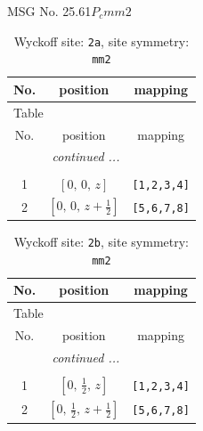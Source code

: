 \documentclass[fleqn,8pt]{jsarticle}
\begin{document}
\setcounter{MaxMatrixCols}{32}

\renewcommand{\tablename}{Table~}
\renewcommand{\figurename}{Figure~}
\begin{center}
\LARGE
MSG No. 25.61\quad$P_{c}mm2$
\end{center}
\renewcommand{\arraystretch}{1.2}
\begin{longtable}{ccc}
\caption{Wyckoff site: {\tt 2a}, site symmetry: {\tt mm2}}
 \\
 \hline \hline
No. & position & mapping \\ \hline \endfirsthead

\multicolumn{2}{l}{\tablename\ \thetable{}} \\
 \hline \hline
No. & position & mapping \\ \hline \endhead

 \hline \hline
\multicolumn{2}{r}{\footnotesize\it continued ...} \\ \endfoot

 \hline \hline
\multicolumn{2}{r}{} \\ \endlastfoot

1 & $\left[ 0,\, 0,\, z \right]$ & {\tt [1,2,3,4]} \\ \hline
2 & $\left[ 0,\, 0,\, z + \frac{1}{2} \right]$ & {\tt [5,6,7,8]} \\
\end{longtable}
\renewcommand{\arraystretch}{1.2}
\begin{longtable}{ccc}
\caption{Wyckoff site: {\tt 2b}, site symmetry: {\tt mm2}}
 \\
 \hline \hline
No. & position & mapping \\ \hline \endfirsthead

\multicolumn{2}{l}{\tablename\ \thetable{}} \\
 \hline \hline
No. & position & mapping \\ \hline \endhead

 \hline \hline
\multicolumn{2}{r}{\footnotesize\it continued ...} \\ \endfoot

 \hline \hline
\multicolumn{2}{r}{} \\ \endlastfoot

1 & $\left[ 0,\, \frac{1}{2},\, z \right]$ & {\tt [1,2,3,4]} \\ \hline
2 & $\left[ 0,\, \frac{1}{2},\, z + \frac{1}{2} \right]$ & {\tt [5,6,7,8]} \\
\end{longtable}
\renewcommand{\arraystretch}{1.2}
\end{document}
